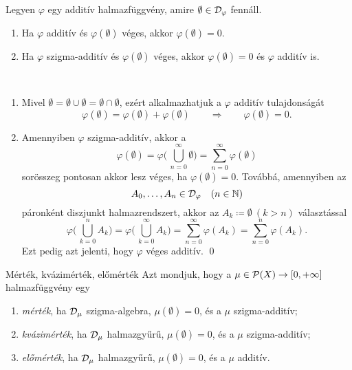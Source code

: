 \documentclass[
]{elteikthesis}[2024/04/26]
\begin{document}
	\begin{stat*}
		Legyen \( \varphi \) egy additív halmazfüggvény, 
		amire \( \emptyset \in \mathcal{D}_{\varphi} \) fennáll.
		\begin{enumerate}
			\item Ha \( \varphi \) additív és \( \varphi(\emptyset) \) véges, 
			akkor \( \varphi(\emptyset) = 0 \).
			
			\item Ha \( \varphi \) szigma-additív és \( \varphi(\emptyset) \) véges, 
			akkor \( \varphi(\emptyset) = 0 \) és \( \varphi \) additív is.
		\end{enumerate}
	\end{stat*}
	\begin{proof*}\,
		\begin{enumerate}
			\item Mivel \( \emptyset = \emptyset \cup \emptyset = \emptyset \cap \emptyset \), ezért alkalmazhatjuk a \( \varphi \) additív tulajdonságát
			\[
				\varphi(\emptyset) = 
				\varphi(\emptyset) + \varphi(\emptyset)
				\qquad \Longrightarrow \qquad
				\varphi(\emptyset) = 0.
			\]
			
			\item Amennyiben \( \varphi \) szigma-additív, akkor a
			\[
				\varphi(\emptyset) =
				\varphi \Biggl(\, \bigcup_{n=0}^\infty \emptyset \Biggr) =
				\sum_{n=0}^{\infty} \varphi(\emptyset)
			\]
			sorösszeg pontosan akkor lesz véges, ha \( \varphi(\emptyset) = 0 \).
			Továbbá, amennyiben az
			\[
				A_0, \dots, A_n \in \mathcal{D}_{\varphi} \quad (n \in \mathbb{N})
			\]
			páronként diszjunkt halmazrendszert, 
			akkor az \( A_k \coloneq \emptyset \ (k > n) \) választással
			\[
				\varphi \Biggl(\, \bigcup_{k=0}^n        A_k \Biggr) =
				\varphi \Biggl(\, \bigcup_{k=0}^{\infty} A_k \Biggr) =
				\sum_{n=0}^{\infty} \varphi(A_k) =
				\sum_{n=0}^n        \varphi(A_k).
			\]
			Ezt pedig azt jelenti, hogy \( \varphi \) véges additív. \qed
		\end{enumerate}
	\end{proof*}
	
	\begin{definition}{Mérték, kvázimérték, előmérték}{}
		Azt mondjuk, hogy a \( \mu \in \mathcal{P}( X ) \to [0, +\infty] \) halmazfüggvény egy
		\begin{enumerate}
			\item \emph{mérték}, ha \( \mathcal{D}_{\mu} \) szigma-algebra, \( \mu(\emptyset) = 0 \), és a \( \mu \) szigma-additív;
			
			\item \emph{kvázimérték}, ha \( \mathcal{D}_{\mu} \) halmazgyűrű, 
			\( \mu(\emptyset) = 0 \), és a \( \mu \) szigma-additív;
			
			\item \emph{előmérték}, ha \( \mathcal{D}_{\mu} \) halmazgyűrű, 
			\( \mu(\emptyset) = 0 \), és a \( \mu \) additív.
		\end{enumerate}
	\end{definition}
		
\end{document}
